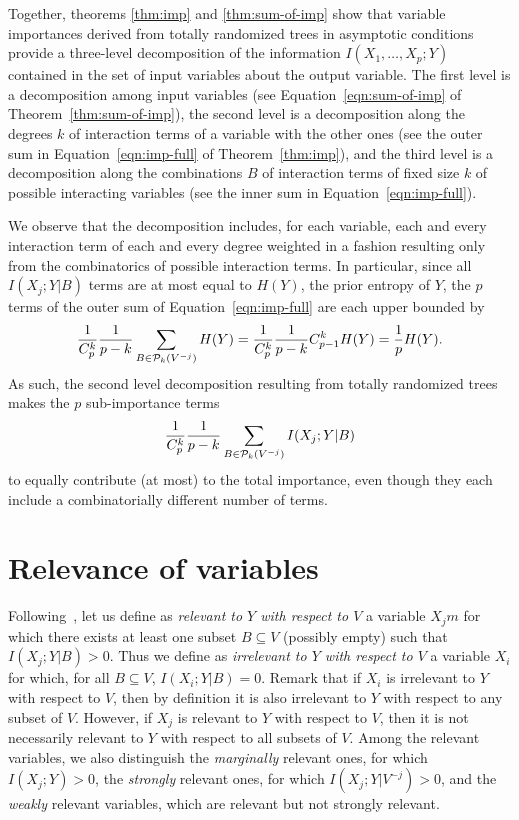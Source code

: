 Together, theorems \ref{thm:imp} and \ref{thm:sum-of-imp} show that  variable
importances derived from totally randomized trees in asymptotic conditions
provide a three-level decomposition of the information $I(X_{1}, \ldots, X_{p}
; Y)$ contained in the set of input variables about the output variable. The
first level is a decomposition among input variables (see Equation~\ref{eqn:sum-of-imp}
of Theorem~\ref{thm:sum-of-imp}),  the second level is a
decomposition along the degrees $k$ of interaction terms of a variable with the
other ones (see the outer sum in Equation~\ref{eqn:imp-full} of
Theorem~\ref{thm:imp}), and the third level is a decomposition along the
combinations $B$ of interaction terms of fixed size $k$ of possible interacting
variables (see the inner sum in Equation~\ref{eqn:imp-full}).

We observe that the decomposition includes, for each variable, each and every
interaction term of each and every degree weighted in a fashion resulting only
from the combinatorics of possible interaction terms. In particular, since all
$I(X_j;Y|B)$ terms are at most equal to $H(Y)$, the prior entropy of $Y$,  the
$p$ terms of the outer sum of Equation~\ref{eqn:imp-full} are each upper
bounded by
\begin{equation}
\frac{1}{C^k_p}\frac{1}{p-k}\sum_{B \in {\cal P}_k(V^{-j})}
H(Y)=\frac{1}{C^k_p} \frac{1}{p-k} {C^k_{p-1}} H(Y) = \frac{1}{p}H(Y).
\end{equation}
As such,
the second level decomposition resulting from totally randomized trees makes the
$p$ sub-importance terms
\begin{equation}
\frac{1}{C^k_p} \frac{1}{p-k} \sum_{B \in {\cal P}_k(V^{-j})} I(X_j;Y|B)
\end{equation}
to equally contribute (at most) to the total
importance, even though they each include a combinatorially different number of
terms.


\section{Relevance of variables}
\label{sec:6:variable-relevance}

Following~\citet{kohavi:1997}, let us define as {\em relevant to $Y$ with
respect to $V$} a variable $X_jm$ for which there exists at least one subset $B
\subseteq V$ (possibly empty) such that $I(X_j;Y|B)>0$. Thus we define as {\em
irrelevant to $Y$ with respect to $V$} a variable $X_i$ for which, for all $B
\subseteq V$, $I(X_i; Y|B)=0$. Remark that if $X_i$ is irrelevant to $Y$ with
respect to $V$, then by definition it is also irrelevant to $Y$ with respect to
any subset of $V$. However, if $X_j$ is relevant to $Y$ with respect to $V$,
then it is not necessarily relevant to $Y$ with respect to all  subsets of $V$.
Among the relevant variables, we also distinguish the {\em marginally} relevant
ones, for which $I(X_{j}; Y) > 0$, the  {\em strongly} relevant ones, for which
$I(X_{j}; Y | V^{-j}) > 0$,  and the {\em weakly} relevant variables, which are
relevant but not strongly relevant.

